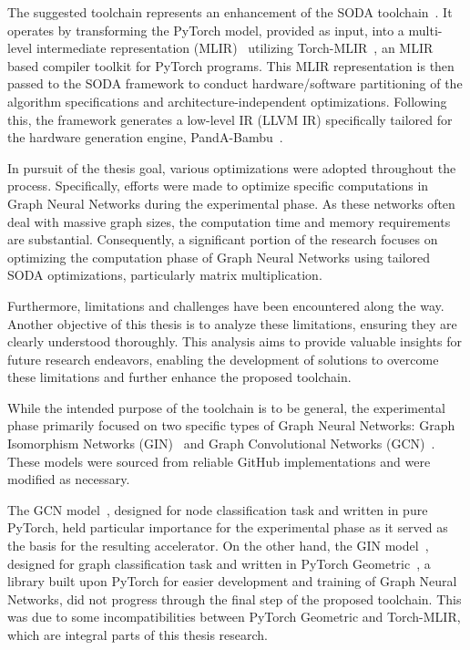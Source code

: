The suggested toolchain represents an enhancement of the SODA toolchain~\cite{9786533}.
It operates by transforming the PyTorch model, provided as input, into a multi-level intermediate representation
(MLIR)~\cite{9370308} utilizing Torch-MLIR~\cite{torch_mlir}, an MLIR based compiler toolkit for PyTorch programs.
This MLIR representation is then passed to the SODA framework to conduct hardware/software partitioning of the algorithm
specifications and architecture-independent optimizations.
Following this, the framework generates a low-level IR (LLVM IR) specifically tailored for the hardware generation engine,
PandA-Bambu~\cite{9586110}.

In pursuit of the thesis goal, various optimizations were adopted throughout the process.
Specifically, efforts were made to optimize specific computations in Graph Neural Networks during the experimental phase.
As these networks often deal with massive graph sizes, the computation time and memory requirements are substantial.
Consequently, a significant portion of the research focuses on optimizing the computation phase of Graph Neural Networks using
tailored SODA optimizations, particularly matrix multiplication.

Furthermore, limitations and challenges have been encountered along the way.
Another objective of this thesis is to analyze these limitations, ensuring they are clearly understood thoroughly.
This analysis aims to provide valuable insights for future research endeavors, enabling the development of solutions
to overcome these limitations and further enhance the proposed toolchain.

While the intended purpose of the toolchain is to be general, the experimental phase primarily focused on two specific
types of Graph Neural Networks: Graph Isomorphism Networks (GIN)~\cite{xu2019powerful} and Graph Convolutional Networks (GCN)~\cite{DBLP:journals/corr/KipfW16}.
These models were sourced from reliable GitHub implementations and were modified as necessary.

The GCN model~\cite{pygcn}, designed for node classification task and written in pure PyTorch, held particular importance for the
experimental phase as it served as the basis for the resulting accelerator.
On the other hand, the GIN model~\cite{ogb_gnn_models}, designed for graph classification task and written in PyTorch Geometric~\cite{DBLP:journals/corr/abs-1903-02428},
a library built upon PyTorch for easier development and training of Graph Neural Networks, did not progress through
the final step of the proposed toolchain.
This was due to some incompatibilities between PyTorch Geometric and Torch-MLIR, which are integral parts of this thesis research.

